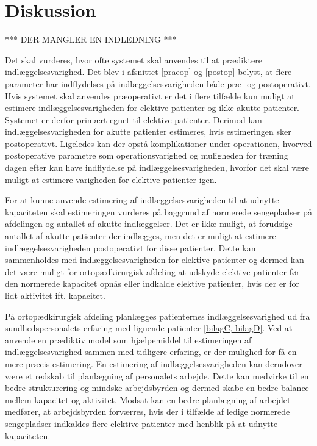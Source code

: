 \section{Diskussion}
*** DER MANGLER EN INDLEDNING ***

Det skal vurderes, hvor ofte systemet skal anvendes til at prædiktere indlæggelsesvarighed. Det blev i afsnittet \ref{praeop} og \ref{postop} belyst, at flere parameter har indflydelses på indlæggelsesvarigheden både præ- og postoperativt. Hvis systemet skal anvendes præoperativt er det i flere tilfælde kun muligt at estimere indlæggelsesvarigheden for elektive patienter og ikke akutte patienter. Systemet er derfor primært egnet til elektive patienter. Derimod kan indlæggelsesvarigheden for akutte patienter estimeres, hvis estimeringen sker postoperativt. Ligeledes kan der opstå komplikationer under operationen, hvorved postoperative parametre som operationsvarighed  og muligheden for træning dagen efter kan have indflydelse på indlæggelsesvarigheden, hvorfor det skal være muligt at estimere varigheden for elektive patienter igen. 


For at kunne anvende estimering af indlæggelsesvarigheden til at udnytte kapaciteten skal estimeringen vurderes på baggrund af normerede sengepladser på afdelingen og antallet af akutte indlæggelser. Det er ikke muligt, at forudsige antallet af akutte patienter der indlægges, men det er muligt at estimere indlæggelsesvarigheden postoperativt for disse patienter. Dette kan sammenholdes med indlæggelsesvarigheden for elektive patienter og dermed kan det være muligt for ortopædkirurgisk afdeling at udskyde elektive patienter før den normerede kapacitet opnås eller indkalde elektive patienter, hvis der er for lidt aktivitet ift. kapacitet.


\noindent
På ortopædkirurgisk afdeling planlægges patienternes indlæggelsesvarighed ud fra sundhedspersonalets erfaring med lignende patienter \ref{bilagC, bilagD}. Ved at anvende en prædiktiv model som hjælpemiddel til estimeringen af indlæggelsesvarighed sammen med tidligere erfaring, er der mulighed for få en mere præcis estimering. 
En estimering af indlæggelsesvarigheden kan  derudover være et redskab til planlægning af personalets arbejde. Dette kan medvirke til en bedre strukturering og mindske arbejdsbyrden og dermed skabe en bedre balance mellem kapacitet og aktivitet. Modsat kan en bedre planlægning af arbejdet medfører, at arbejdsbyrden forværres, hvis der i tilfælde af ledige normerede sengepladser indkaldes flere elektive patienter med henblik på at udnytte kapaciteten. 



